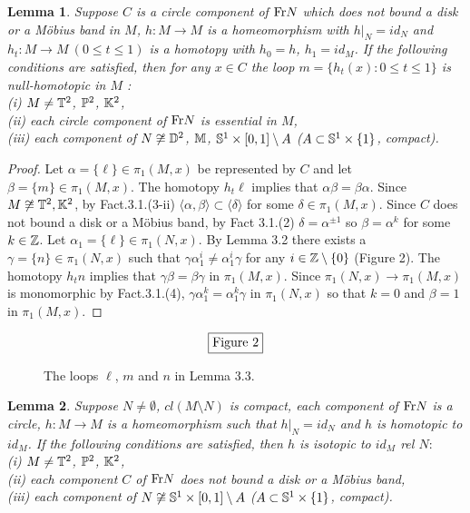\documentclass[11pt]{amsart}
\newtheorem{lemma}{Lemma}[section]
\theoremstyle{definition}
\newtheorem*{Proof of Theorem 3.1}{Proof of Theorem 3.1}
\newtheorem*{Proof of Corollary 3.1}{Proof of Corollary 3.1}
\newtheorem*{Proof of Proposition 4.1.(1)}{Proof of Proposition 4.1.(1)}
\newtheorem*{Proof of Proposition 4.1.(2)}{Proof of Proposition 4.1.(2)}
\newtheorem*{Proof of Corollary 1.1}{Proof of Corollary 1.1}
\begin{document}
\begin{lemma}
Suppose $C$ is a circle component of ${\rm Fr}N$ which does not bound a disk or a M\"obius band in $M$, $h : M \to M$ is a homeomorphism with $h|_N = id_N$ and $h_t: M \to M \ (0 \leq t \leq 1)$ is a homotopy with $h_0 = h$, $h_1 = id_M$. If the following conditions are satisfied, then for any $x \in C$ the loop $m = \{ h_t(x) : 0 \leq t \leq 1 \}$ is null-homotopic in $M$ : \\
{\rm (i)} $M \neq {\Bbb T}^2$, ${\Bbb P}^2$, ${\Bbb K}^2$, \\ 
{\rm (ii)} each circle component of ${\rm Fr}N$ is essential in $M$, \\ 
{\rm (iii)} each component of $N \not\cong {\Bbb D}^2$, ${\Bbb M}$, ${\Bbb S}^1 \times [0, 1] \setminus A$ {\rm (}$A \subset {\Bbb S}^1 \times \{ 1 \}$, compact{\rm )}.
\end{lemma}

\begin{proof}
Let $\alpha = \{ \ell \} \in \pi_1(M, x)$ be represented by $C$ and let $\beta = \{ m \} \in \pi_1(M, x)$. The homotopy $h_t \ell$ implies that $\alpha \beta = \beta \alpha$. Since $M \not\cong {\Bbb T}^2, {\Bbb K}^2$, by Fact.3.1.(3-ii) $\langle \alpha, \beta \rangle \subset \langle \delta \rangle$ for some $\delta \in \pi_1(M, x)$. Since $C$ does not bound a disk or a M\"obius band, by Fact 3.1.(2) $\delta = \alpha^{\pm 1}$ so $\beta = \alpha^k$ for some $k \in {\Bbb Z}$. Let $\alpha_1 = \{ \ell \} \in \pi_1(N, x)$. By Lemma 3.2 there exists a $\gamma = \{ n \} \in \pi_1(N, x)$ such that $\gamma \alpha_1^i \neq \alpha_1^i \gamma$ for any $i \in {\Bbb Z} \setminus \{ 0 \}$ (Figure 2). The homotopy $h_tn$ implies that $\gamma \beta = \beta \gamma$ in $\pi_1(M, x)$. Since $\pi_1(N, x) \to \pi_1(M, x)$ is monomorphic by Fact.3.1.(4), $\gamma \alpha_1^k = \alpha_1^k \gamma$ in $\pi_1(N, x)$ so that $k = 0$ and $\beta = 1$ in $\pi_1(M, x)$.
\end{proof}

\begin{figure}[h]
\caption{The loops $\ell$, $m$ and $n$ in Lemma 3.3.}
\[ \fbox{Figure 2} \]
\end{figure}

\begin{lemma}
Suppose $N \neq \emptyset$, $cl(M \setminus N)$ is compact, each component of ${\rm Fr}N$ is a circle, $h : M \to M$ is a homeomorphism such that $h|_N = id_N$ and $h$ is homotopic to $id_M$. If the following conditions are satisfied, then $h$ is isotopic to $id_M$ rel $N:$ \\ 
{\rm (i)} $M \neq {\Bbb T}^2$, ${\Bbb P}^2$, ${\Bbb K}^2$, \\ 
{\rm (ii)} each component $C$ of ${\rm Fr}N$ does not bound a disk or a M\"obius band, \\
{\rm (iii)} each component of $N \not\cong {\Bbb S}^1 \times [0, 1] \setminus A$ {\rm (}$A \subset {\Bbb S}^1 \times \{ 1 \}$, compact{\rm )}. \end{lemma}
\end{document}
